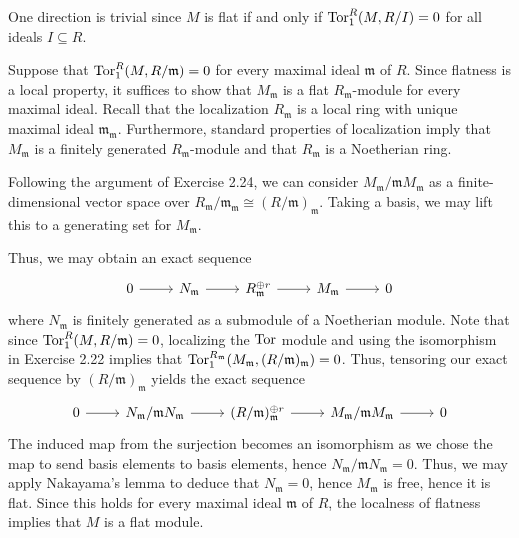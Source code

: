 \documentclass[../../master.tex]{subfiles}
\begin{document}
\begin{solution}
    One direction is trivial since $M$ is flat if and only if $\operatorname{Tor}_1^{R}(M, R/I) = 0$ for all ideals $I \subseteq R$.

    Suppose that $\operatorname{Tor}_1^{R}(M, R/\mathfrak{m}) = 0$ for every maximal ideal $\mathfrak{m}$ of $R$.
    Since flatness is a local property, it suffices to show that $M_\mathfrak{m}$ is a flat $R_\mathfrak{m}$-module for every maximal ideal.
    Recall that the localization $R_\mathfrak{m}$ is a local ring with unique maximal ideal $\mathfrak{m}_\mathfrak{m}$.
    Furthermore, standard properties of localization imply that $M_\mathfrak{m}$ is a finitely generated $R_\mathfrak{m}$-module and that $R_\mathfrak{m}$ is a Noetherian ring.

    Following the argument of Exercise 2.24, we can consider $M_\mathfrak{m}/\mathfrak{m}M_\mathfrak{m}$ as a finite-dimensional vector space over $R_\mathfrak{m}/\mathfrak{m}_\mathfrak{m} \cong (R/\mathfrak{m})_\mathfrak{m}$.
    Taking a basis, we may lift this to a generating set for $M_\mathfrak{m}$.

    Thus, we may obtain an exact sequence
    \[
    \begin{tikzcd}
        0 & N_\mathfrak{m} & R_\mathfrak{m}^{\oplus r} & M_\mathfrak{m} & 0
        \arrow[from=1-1, to=1-2]
        \arrow[from=1-2, to=1-3]
        \arrow[from=1-3, to=1-4]
        \arrow[from=1-4, to=1-5] 
    \end{tikzcd}
    \]
    where $N_\mathfrak{m}$ is finitely generated as a submodule of a Noetherian module.
    Note that since $\operatorname{Tor}_1^{R}(M, R/\mathfrak{m}) = 0$, localizing the $\operatorname{Tor}$ module and using the isomorphism in Exercise 2.22 implies that $\operatorname{Tor}_1^{R_\mathfrak{m}}(M_\mathfrak{m}, (R/\mathfrak{m})_\mathfrak{m}) = 0$.
    Thus, tensoring our exact sequence by $(R/\mathfrak{m})_\mathfrak{m}$ yields the exact sequence
    \[
    \begin{tikzcd}
        0 & N_\mathfrak{m}/\mathfrak{m}N_\mathfrak{m} & (R/\mathfrak{m})_\mathfrak{m}^{\oplus r} & M_\mathfrak{m}/\mathfrak{m}M_\mathfrak{m} & 0
        \arrow[from=1-1, to=1-2]
        \arrow[from=1-2, to=1-3]
        \arrow[from=1-3, to=1-4]
        \arrow[from=1-4, to=1-5] 
    \end{tikzcd}
    \]
    The induced map from the surjection becomes an isomorphism as we chose the map to send basis elements to basis elements, hence $N_\mathfrak{m}/\mathfrak{m}N_\mathfrak{m} = 0$.
    Thus, we may apply Nakayama's lemma to deduce that $N_\mathfrak{m} = 0$, hence $M_\mathfrak{m}$ is free, hence it is flat.
    Since this holds for every maximal ideal $\mathfrak{m}$ of $R$, the localness of flatness implies that $M$ is a flat module.
\end{solution}
\end{document}
